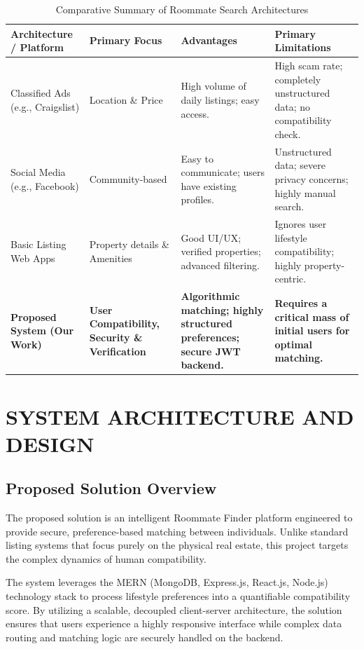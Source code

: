 \documentclass[12pt,a4paper]{report}
\begin{document}
\begin{table}[H]
\centering
\caption{Comparative Summary of Roommate Search Architectures}
\vspace{0.3cm}
\begin{tabularx}{\textwidth}{|X|X|X|X|}
\hline
\textbf{Architecture / Platform} & \textbf{Primary Focus} & \textbf{Advantages} & \textbf{Primary Limitations} \\
\hline
Classified Ads (e.g., Craigslist) & Location \& Price & High volume of daily listings; easy access. & High scam rate; completely unstructured data; no compatibility check. \\
\hline
Social Media (e.g., Facebook) & Community-based & Easy to communicate; users have existing profiles. & Unstructured data; severe privacy concerns; highly manual search. \\
\hline
Basic Listing Web Apps & Property details \& Amenities & Good UI/UX; verified properties; advanced filtering. & Ignores user lifestyle compatibility; highly property-centric. \\
\hline
\textbf{Proposed System (Our Work)} & \textbf{User Compatibility, Security \& Verification} & \textbf{Algorithmic matching; highly structured preferences; secure JWT backend.} & \textbf{Requires a critical mass of initial users for optimal matching.} \\
\hline
\end{tabularx}
\end{table}

\chapter{SYSTEM ARCHITECTURE AND DESIGN}

\section{Proposed Solution Overview}
The proposed solution is an intelligent Roommate Finder platform engineered to provide secure, preference-based matching between individuals. Unlike standard listing systems that focus purely on the physical real estate, this project targets the complex dynamics of human compatibility. 

The system leverages the MERN (MongoDB, Express.js, React.js, Node.js) technology stack to process lifestyle preferences into a quantifiable compatibility score. By utilizing a scalable, decoupled client-server architecture, the solution ensures that users experience a highly responsive interface while complex data routing and matching logic are securely handled on the backend.
\end{document}
